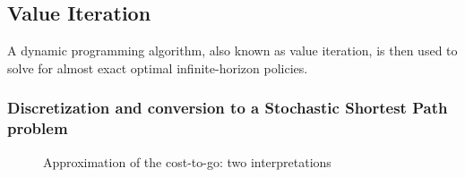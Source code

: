 \subsection{Value Iteration}
\label{sec:VI}

A dynamic programming algorithm, also known as value iteration, is then used to solve for almost exact optimal infinite-horizon policies. 

\subsubsection{Discretization and conversion to a Stochastic Shortest Path problem}
\label{sec:ConvertionToAStocasticShortestPathProblem}

%
\begin{figure}[t]
        \centering
       \caption{Approximation of the cost-to-go: two interpretations }
			\label{fig:aaa}
			\vspace{-10pt}
\end{figure}
%


